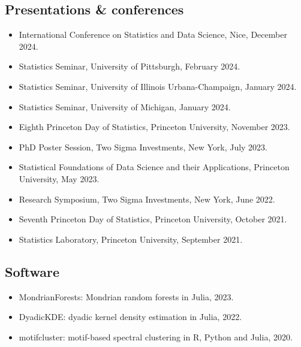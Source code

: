 \documentclass{wgu-cv}
\begin{document}
\subsection{Presentations \& conferences}{}
\begin{itemize}
  \item International Conference on Statistics and Data Science, Nice,
    December 2024.
  \item Statistics Seminar, University of Pittsburgh,
    February 2024.
  \item Statistics Seminar, University of Illinois Urbana-Champaign,
    January 2024.
  \item Statistics Seminar, University of Michigan,
    January 2024.
  \item Eighth Princeton Day of Statistics, Princeton University,
    November 2023.
  \item PhD Poster Session, Two Sigma Investments, New York,
    July 2023.
  \item Statistical Foundations of Data Science and their Applications,
    Princeton University,
    May 2023.
  \item Research Symposium, Two Sigma Investments, New York,
    June 2022.
  \item Seventh Princeton Day of Statistics, Princeton University,
    October 2021.
  \item Statistics Laboratory, Princeton University,
    September 2021.
\end{itemize}

\subsection{Software}{}
\begin{itemize}

  \item MondrianForests: Mondrian random forests in Julia, 2023. \\

  \item DyadicKDE: dyadic kernel density estimation in Julia, 2022. \\

  \item motifcluster: motif-based spectral clustering
    in R, Python and Julia, 2020. \\

\end{itemize}
\end{document}

